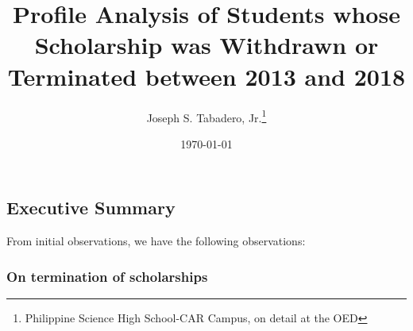 \documentclass[a4paper]{article}
\title{Profile Analysis of Students whose Scholarship was Withdrawn or
Terminated between 2013 and 2018}
\author{Joseph S. Tabadero,
Jr.\thanks{Philippine Science High School-CAR Campus, on detail at the OED}}
\date{\today}
\begin{document}
\maketitle

\hypertarget{executive-summary}{%
\subsection{Executive Summary}\label{executive-summary}}

From initial observations, we have the following observations:

\hypertarget{on-termination-of-scholarships}{%
\subsubsection{On termination of
scholarships}\label{on-termination-of-scholarships}}
\end{document}

